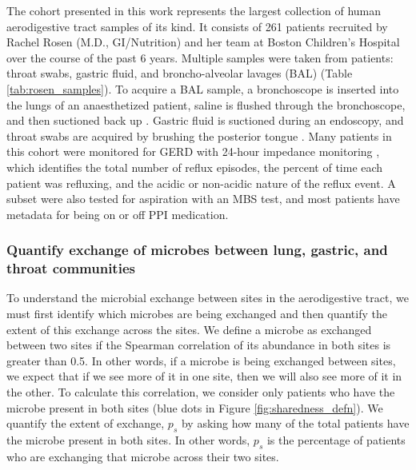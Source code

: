 \documentclass[12pt]{article}
\begin{document}
The cohort presented in this work represents the largest collection of 
human aerodigestive tract samples of its kind.
It consists of 261 patients recruited by Rachel Rosen 
(M.D., GI/Nutrition) and her team at Boston Children's Hospital  
over the course of the past 6 years. Multiple samples were 
taken from patients: throat swabs, gastric fluid, and broncho-alveolar lavages (BAL) (Table \ref{tab:rosen_samples}). 
To acquire a BAL sample, a bronchoscope is inserted into the lungs 
of an anaesthetized patient, saline is flushed through the 
bronchoscope, and then suctioned back up \cite{charslon-topographical-2011}. 
Gastric fluid is suctioned during an endoscopy, and throat
swabs are acquired by brushing the posterior tongue \cite{rosen-ppi-2015}. 
Many patients in this cohort were monitored for GERD with 24-hour
impedance monitoring \cite{vakil-gerd_defn-2006}, which identifies the total number of reflux episodes,
the percent of time each patient was refluxing, and the acidic or non-acidic
nature of the reflux event. A subset were also tested for aspiration with
an MBS test, and most patients have metadata for being on or off PPI medication.

\subsubsection{Quantify exchange of microbes between lung, gastric, and throat communities} \label{sec:exchange}

To understand the microbial exchange between sites in the 
aerodigestive tract, we must first identify which microbes are being exchanged
and then quantify the extent of this exchange across the sites. 
We define a microbe as exchanged between two sites if the Spearman 
correlation of its abundance in both sites is greater than 0.5.
In other words, if a microbe is being exchanged between sites, we expect that if we see 
more of it in one site, then we will also see more of it in the other. 
To calculate this correlation, we consider only patients who have the microbe present in both sites (blue dots in Figure \ref{fig:sharedness_defn}).
We quantify the extent of exchange, $p_s$ by asking how many of the total patients
have the microbe present in both sites. In other words, $p_s$ is the 
percentage of patients who are exchanging that microbe across their two sites.
\end{document}
